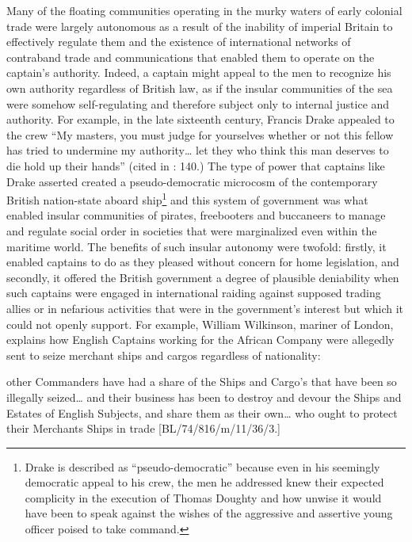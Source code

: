 Many of the floating communities operating in the murky waters of early colonial trade were largely autonomous as a result of the inability of imperial Britain to effectively regulate them and the existence of international networks of contraband trade and communications that enabled them to operate on the captain’s authority. Indeed, a captain might appeal to the men to recognize his own authority regardless of British law, as if the insular communities of the sea were somehow self-regulating and therefore subject only to internal justice and authority. For example, in the late sixteenth century, Francis Drake appealed to the crew “My masters, you must judge for yourselves whether or not this fellow has tried to undermine my authority… let they who think this man deserves to die hold up their hands” (cited in \citealt{Bicheno2012}: 140.) The type of power that captains like Drake asserted created a pseudo-democratic microcosm of the contemporary British nation-state aboard ship\footnote{Drake is described as “pseudo-democratic” because even in his seemingly democratic appeal to his crew, the men he addressed knew their expected complicity in the execution of Thomas Doughty and how unwise it would have been to speak against the wishes of the aggressive and assertive young officer poised to take command.}  and this system of government was what enabled insular communities of pirates, freebooters and buccaneers to manage and regulate social order in societies that were marginalized even within the maritime world. The benefits of such insular autonomy were twofold: firstly, it enabled captains to do as they pleased without concern for home legislation, and secondly, it offered the British government a degree of plausible deniability when such captains were engaged in international raiding against supposed trading allies or in nefarious activities that were in the government’s interest but which it could not openly support. For example, William Wilkinson, mariner of London, explains how English Captains working for the African Company were allegedly sent to seize merchant ships and cargos regardless of nationality: 

other Commanders have had a share of the Ships and Cargo’s that have been so illegally seized… and their business has been to destroy and devour the Ships and Estates of English Subjects, and share them as their own… who ought to protect their Merchants Ships in trade [BL/74/816/m/11/36/3.] 

